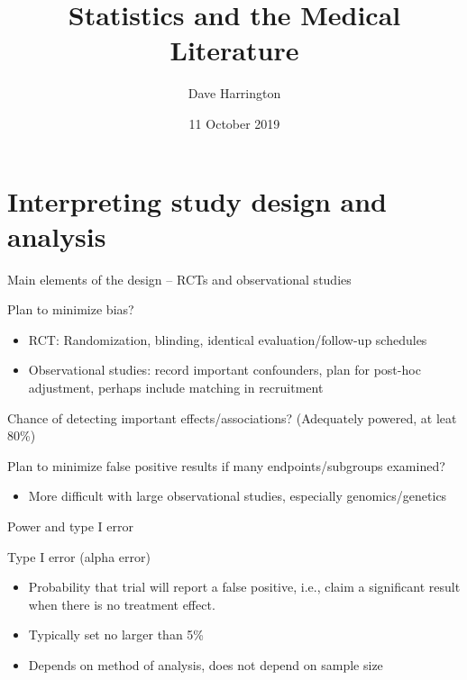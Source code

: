 \documentclass[ignorenonframetext,]{beamer}
\title{Statistics and the Medical Literature}
\author{Dave Harrington}
\date{11 October 2019}
\providecommand{\tightlist}{%
  \setlength{\itemsep}{0pt}\setlength{\parskip}{0pt}}
\begin{document}
\frame{\titlepage}

\begin{frame}
\tableofcontents[hideallsubsections]
\end{frame}
\hypertarget{interpreting-study-design-and-analysis}{%
\section{Interpreting study design and
analysis}\label{interpreting-study-design-and-analysis}}

\begin{frame}{%
\protect\hypertarget{main-elements-of-the-design-rcts-and-observational-studies}{%
Main elements of the design – RCTs and observational studies}}

Plan to minimize bias?

\begin{itemize}
\item
  RCT: Randomization, blinding, identical evaluation/follow-up schedules
\item
  Observational studies: record important confounders, plan for post-hoc
  adjustment, perhaps include matching in recruitment
\end{itemize}

Chance of detecting important effects/associations? (Adequately powered,
at leat 80\%) \medskip

Plan to minimize false positive results if many endpoints/subgroups
examined?

\begin{itemize}
\tightlist
\item
  More difficult with large observational studies, especially
  genomics/genetics
\end{itemize}

\end{frame}

\begin{frame}{%
\protect\hypertarget{power-and-type-i-error}{%
Power and type I error}}

Type I error (alpha error)

\begin{itemize}
\item
  Probability that trial will report a false positive, i.e., claim a
  significant result when there is no treatment effect.
\item
  Typically set no larger than 5\%
\item
  Depends on method of analysis, does not depend on sample size
\end{itemize}

\end{frame}
\end{document}
